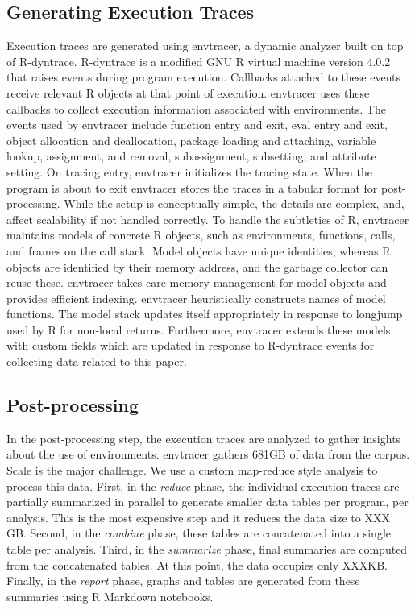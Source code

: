 \documentclass[10pt,review,sigplan,anonymous=true,authorversion=true,nonacm=true]{acmart}
\newcommand{\envtracer}{{\sf envtracer}\xspace}
\newcommand{\rdyntrace}{{\sf R-dyntrace}\xspace}
\begin{document}
\subsection{Generating Execution Traces}
Execution traces are generated using \envtracer, a dynamic analyzer built on top
of \rdyntrace. \rdyntrace is a modified GNU R virtual machine version
4.0.2~\cite{oopsla19b} that raises events during program execution. Callbacks
attached to these events receive relevant R objects at that point of execution.
\envtracer uses these callbacks to collect execution information associated with
environments. The events used by \envtracer include function entry and exit,
eval entry and exit, object allocation and deallocation, package loading and
attaching, variable lookup, assignment, and removal, subassignment, subsetting,
and attribute setting. On tracing entry, \envtracer initializes the tracing
state. When the program is about to exit \envtracer stores the traces in a
tabular format for post-processing. While the setup is conceptually simple, the
details are complex, and, affect scalability if not handled correctly. To handle
the subtleties of R, \envtracer maintains models of concrete R objects, such as
environments, functions, calls, and frames on the call stack. Model objects have
unique identities, whereas R objects are identified by their memory address, and
the garbage collector can reuse these. \envtracer takes care memory management
for model objects and provides efficient indexing. \envtracer heuristically
constructs names of model functions. The model stack updates itself
appropriately in response to longjump used by R for non-local returns.
Furthermore, \envtracer extends these models with custom fields which are
updated in response to \rdyntrace events for collecting data related to this
paper.

\subsection{Post-processing}
In the post-processing step, the execution traces are analyzed to gather
insights about the use of environments. \envtracer gathers 681GB of data from
the corpus. Scale is the major challenge. We use a custom map-reduce style
analysis to process this data. First, in the \textit{reduce} phase, the
individual execution traces are partially summarized in parallel to generate
smaller data tables per program, per analysis. This is the most expensive step
and it reduces the data size to XXX GB. Second, in the \textit{combine} phase,
these tables are concatenated into a single table per analysis. Third, in the
\textit{summarize} phase, final summaries are computed from the concatenated
tables. At this point, the data occupies only XXXKB. Finally, in the
\textit{report} phase, graphs and tables are generated from these summaries
using R Markdown notebooks\cite{rmdpkg, rmdguide, rmdcookbook}.
\end{document}
